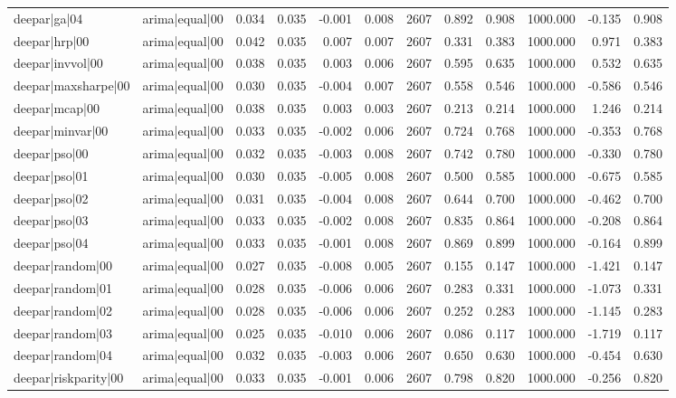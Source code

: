 \begin{table}
\begin{tabular}{llrrrrrrrrrr}
deepar|ga|04 & arima|equal|00 & 0.034 & 0.035 & -0.001 & 0.008 & 2607 & 0.892 & 0.908 & 1000.000 & -0.135 & 0.908 \\
deepar|hrp|00 & arima|equal|00 & 0.042 & 0.035 & 0.007 & 0.007 & 2607 & 0.331 & 0.383 & 1000.000 & 0.971 & 0.383 \\
deepar|invvol|00 & arima|equal|00 & 0.038 & 0.035 & 0.003 & 0.006 & 2607 & 0.595 & 0.635 & 1000.000 & 0.532 & 0.635 \\
deepar|maxsharpe|00 & arima|equal|00 & 0.030 & 0.035 & -0.004 & 0.007 & 2607 & 0.558 & 0.546 & 1000.000 & -0.586 & 0.546 \\
deepar|mcap|00 & arima|equal|00 & 0.038 & 0.035 & 0.003 & 0.003 & 2607 & 0.213 & 0.214 & 1000.000 & 1.246 & 0.214 \\
deepar|minvar|00 & arima|equal|00 & 0.033 & 0.035 & -0.002 & 0.006 & 2607 & 0.724 & 0.768 & 1000.000 & -0.353 & 0.768 \\
deepar|pso|00 & arima|equal|00 & 0.032 & 0.035 & -0.003 & 0.008 & 2607 & 0.742 & 0.780 & 1000.000 & -0.330 & 0.780 \\
deepar|pso|01 & arima|equal|00 & 0.030 & 0.035 & -0.005 & 0.008 & 2607 & 0.500 & 0.585 & 1000.000 & -0.675 & 0.585 \\
deepar|pso|02 & arima|equal|00 & 0.031 & 0.035 & -0.004 & 0.008 & 2607 & 0.644 & 0.700 & 1000.000 & -0.462 & 0.700 \\
deepar|pso|03 & arima|equal|00 & 0.033 & 0.035 & -0.002 & 0.008 & 2607 & 0.835 & 0.864 & 1000.000 & -0.208 & 0.864 \\
deepar|pso|04 & arima|equal|00 & 0.033 & 0.035 & -0.001 & 0.008 & 2607 & 0.869 & 0.899 & 1000.000 & -0.164 & 0.899 \\
deepar|random|00 & arima|equal|00 & 0.027 & 0.035 & -0.008 & 0.005 & 2607 & 0.155 & 0.147 & 1000.000 & -1.421 & 0.147 \\
deepar|random|01 & arima|equal|00 & 0.028 & 0.035 & -0.006 & 0.006 & 2607 & 0.283 & 0.331 & 1000.000 & -1.073 & 0.331 \\
deepar|random|02 & arima|equal|00 & 0.028 & 0.035 & -0.006 & 0.006 & 2607 & 0.252 & 0.283 & 1000.000 & -1.145 & 0.283 \\
deepar|random|03 & arima|equal|00 & 0.025 & 0.035 & -0.010 & 0.006 & 2607 & 0.086 & 0.117 & 1000.000 & -1.719 & 0.117 \\
deepar|random|04 & arima|equal|00 & 0.032 & 0.035 & -0.003 & 0.006 & 2607 & 0.650 & 0.630 & 1000.000 & -0.454 & 0.630 \\
deepar|riskparity|00 & arima|equal|00 & 0.033 & 0.035 & -0.001 & 0.006 & 2607 & 0.798 & 0.820 & 1000.000 & -0.256 & 0.820 \\

\end{tabular}
\end{table}
